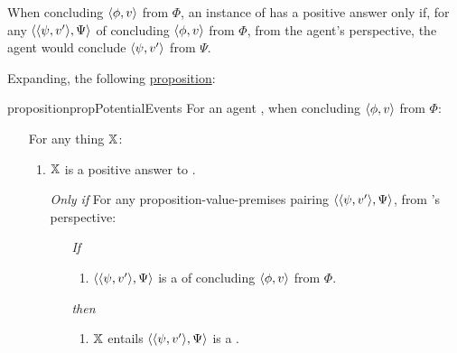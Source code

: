 \begin{note}
  When concluding \(\pv{\phi}{v}\) from \(\Phi\), an instance of \qzS{} has a positive answer only if, for any \requ{} \(\pvp{\psi}{v'}{\Psi}\) of concluding \(\pv{\phi}{v}\) from \(\Phi\), from the agent's perspective, the agent would conclude \(\pv{\psi}{v'}\) from \(\Psi\).

  Expanding, the following \hyperref[prop:PWEs]{proposition}:

  \begin{restatable}{proposition}{propPotentialEvents}
    \label{prop:PWEs}
    For an agent \vAgent{}, when concluding \(\pv{\phi}{v}\) from \(\Phi\):

    \begin{itemize}
    \item[]
      For any thing \(\qzSaV{}\):
      \begin{enumerate}[label=\alph*., ref=(\alph*)]
      \item
        \label{prop:PWEs:a}
        \(\qzSaV{}\) is a positive answer to \qzS{}.
      \end{enumerate}
      \begin{itemize}
      \item[\emph{Only if}]
        For any proposition-value-premises pairing \(\pvp{\psi}{v'}{\Psi}\), from \vAgent{}'s perspective:
        \begin{itemize}
        \item[\emph{If}]
          \begin{enumerate}[label=\alph*., ref=(\alph*), resume]
          \item
            \label{prop:PWEs:b}
            \(\pvp{\psi}{v'}{\Psi}\) is a \requ{} of \vAgent{} concluding \(\pv{\phi}{v}\) from \(\Phi\).
          \end{enumerate}
        \item[\emph{then}]
          \begin{enumerate}[label=\alph*., ref=(\alph*), resume]
          \item
            \label{prop:PWEs:c}
            \(\qzSaV{}\) entails \(\pvp{\psi}{v'}{\Psi}\) is a \fc{}.
          \end{enumerate}
        \end{itemize}
      \end{itemize}
    \end{itemize}
    \vspace{-\baselineskip}
  \end{restatable}


\end{note}

